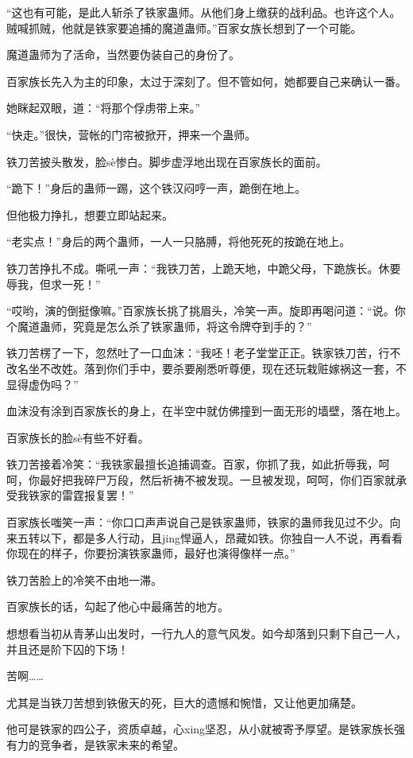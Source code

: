 \begin{this_body}
“这也有可能，是此人斩杀了铁家蛊师。从他们身上缴获的战利品。也许这个人。贼喊抓贼，他就是铁家要追捕的魔道蛊师。”百家女族长想到了一个可能。

魔道蛊师为了活命，当然要伪装自己的身份了。

百家族长先入为主的印象，太过于深刻了。但不管如何，她都要自己来确认一番。

她眯起双眼，道：“将那个俘虏带上来。”

“快走。”很快，营帐的门帘被掀开，押来一个蛊师。

铁刀苦披头散发，脸sè惨白。脚步虚浮地出现在百家族长的面前。

“跪下！”身后的蛊师一踢，这个铁汉闷哼一声，跪倒在地上。

但他极力挣扎，想要立即站起来。

“老实点！”身后的两个蛊师，一人一只胳膊，将他死死的按跪在地上。

铁刀苦挣扎不成。嘶吼一声：“我铁刀苦，上跪天地，中跪父母，下跪族长。休要辱我，但求一死！”

“哎哟，演的倒挺像嘛。”百家族长挑了挑眉头，冷笑一声。旋即再喝问道：“说。你个魔道蛊师，究竟是怎么杀了铁家蛊师，将这令牌夺到手的？”

铁刀苦楞了一下，忽然吐了一口血沫：“我呸！老子堂堂正正。铁家铁刀苦，行不改名坐不改姓。落到你们手中，要杀要剐悉听尊便，现在还玩栽赃嫁祸这一套，不显得虚伪吗？”

血沫没有涂到百家族长的身上，在半空中就仿佛撞到一面无形的墙壁，落在地上。

百家族长的脸sè有些不好看。

铁刀苦接着冷笑：“我铁家最擅长追捕调查。百家，你抓了我，如此折辱我，呵呵，你最好把我碎尸万段，然后祈祷不被发现。一旦被发现，呵呵，你们百家就承受我铁家的雷霆报复罢！”

百家族长嗤笑一声：“你口口声声说自己是铁家蛊师，铁家的蛊师我见过不少。向来五转以下，都是多人行动，且jing悍逼人，昂藏如铁。你独自一人不说，再看看你现在的样子，你要扮演铁家蛊师，最好也演得像样一点。”

铁刀苦脸上的冷笑不由地一滞。

百家族长的话，勾起了他心中最痛苦的地方。

想想看当初从青茅山出发时，一行九人的意气风发。如今却落到只剩下自己一人，并且还是阶下囚的下场！

苦啊……

尤其是当铁刀苦想到铁傲天的死，巨大的遗憾和惋惜，又让他更加痛楚。

他可是铁家的四公子，资质卓越，心xing坚忍，从小就被寄予厚望。是铁家族长强有力的竞争者，是铁家未来的希望。


\end{this_body}
